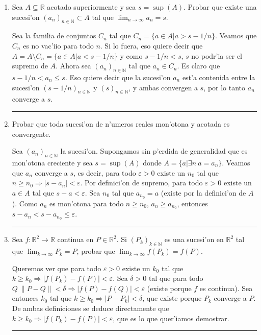 \documentclass[a4paper,spanish]{article}
\newcommand{\R}[0]{\mathbb{R}}
\newcommand{\N}[0]{\mathbb{N}}
\newcommand{\norma}[1]{\left\|#1\right\|}
\newcommand{\limite}[2]{\lim_{ #1 \rightarrow #2}}
\newcommand{\eps}[0]{\varepsilon}
\newcommand{\lthen}[0]{\Rightarrow}
\newenvironment{demo}{{\noindent \textbf{Demo: }}}{\hfill\rule{2mm}{2mm}\par}
\begin{document}
\begin{enumerate}
\item 
Sea $A \subseteq \R$ acotado superiormente y sea $s = \sup(A)$. Probar que
existe una sucesi'on $(a_n)_{n \in \N} \subset A$ tal que 
$\limite{n}{\infty} a_n = s$.

\begin{demo}
Sea la familia de conjuntos $C_n$ tal que $C_n = \{a \in A | a > s - 1/n\}$.
Veamos que $C_n$ es no vac'iio para todo $n$. Si lo fuera, eso quiere decir que
$A = A \setminus C_n = \{a \in A | a < s - 1/n\}$ y como $s - 1/n < s$, $s$ no
podr'ia ser el supremo de $A$. Ahora sea $(a_n)_{n \in \N}$ tal que
$a_n \in C_n$. Es claro que $s - 1/n < a_n \leq s$. Eso quiere decir que la 
sucesi'on $a_n$ est'a contenida entre la sucesi'on $(s - 1/n)_{n \in \N}$ y
$(s)_{n \in \N}$, y ambas convergen a $s$, por lo tanto $a_n$ converge a $s$.
\end{demo}

\item
Probar que toda sucesi'on de n'umeros reales mon'otona y acotada es
convergente.

\begin{demo}
Sea $(a_n)_{n \in \N}$ la sucesi'on. Supongamos sin p'erdida de generalidad
que es mon'otona creciente y sea $s = \sup(A)$ donde
$A = \{a | \exists n\ a = a_n\}$. Veamos que $a_n$ converge a $s$,
es decir, para todo $\eps > 0$ existe un $n_0$ tal que $n \geq n_0 \lthen 
|s - a_n| < \eps$. Por definici'on de supremo, para todo $\eps > 0$
existe un $a \in A$ tal que $s - a < \eps$. Sea $n_0$ tal que $a_{n_0} = a$
(existe por la definici'on de $A$). Como $a_n$ es mon'otona para todo 
$n \geq n_0$, $a_n \geq a_{n_0}$, entonces $s - a_n < s - a_{n_0} \leq \eps$.
\end{demo}

\item
Sea $f : \R^2 \to \R$ continua en $P \in \R^2$. Si $(P_k)_{k \in \N}$ es una
sucesi'on en $\R^2$ tal que $\limite{k}{\infty} P_k = P$, probar que
$\limite{k}{\infty} f(P_k) = f(P)$.

\begin{demo}
Queremos ver que para todo $\eps > 0$ existe un $k_0$ tal que 
$k \geq k_0 \lthen | f(P_k) - f(P) | < \eps$. Sea $\delta > 0$ tal que para todo 
$Q\ \norma{P - Q} < \delta \lthen | f(P) - f(Q) | < \eps$ (existe porque $f$ 
es continua). Sea entonces $k_0$ tal que 
$k \geq k_0 \lthen |P - P_k| < \delta$, que existe porque $P_k$ 
converge a $P$. De ambas definiciones se deduce directamente que
$k \geq k_0 \lthen | f(P_k) - f(P) | < \eps$, que es lo que quer'iamos
demostrar.
\end{demo}


\end{enumerate}
\end{document}
